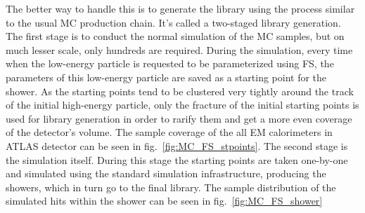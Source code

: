 The better way to handle this is to generate the library using the process similar to the usual MC production chain. It's called a two-staged library generation. The first stage is to conduct the normal simulation of the MC samples, but on much lesser scale, only hundreds are required. During the simulation, every time when the low-energy particle is requested to be parameterized using FS, the parameters of this low-energy particle are saved as a starting point for the shower. As the starting points tend to be clustered very tightly around the track of the initial high-energy particle, only the fracture of the initial starting points is used for library generation in order to rarify them and get a more even coverage of the detector's volume. The sample coverage of the all EM calorimeters in ATLAS detector can be seen in fig.~\ref{fig:MC_FS_stpoints}. The second stage is the simulation itself. During this stage the starting points are taken one-by-one and simulated using the standard simulation infrastructure, producing the showers, which in turn go to the final library. The sample distribution of the simulated hits within the shower can be seen in fig.~\ref{fig:MC_FS_shower}

\begin{figure}[htb]
\end{figure}


